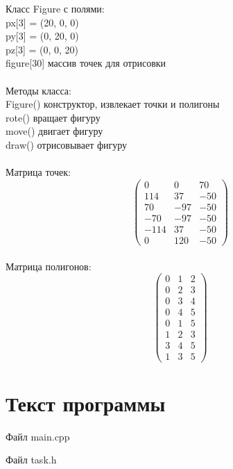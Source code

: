 \documentclass[14pt, a4paper]{extreport}
\begin{document}
Класс Figure с полями:\\
px[3] = (20, 0, 0)\\
py[3] = (0, 20, 0)\\
pz[3] = (0, 0, 20)\\
figure[30] массив точек для отрисовки\\
\\
Методы класса:\\
Figure() конструктор, извлекает точки и полигоны\\
rote() вращает фигуру\\
move() двигает фигуру\\
draw() отрисовывает фигуру\\
\\
Матрица точек:\\
\begin{equation*}
\left(
\begin{array}{cccc}
0 & 0 & 70\\
114 & 37 & -50\\
70 & -97 & -50\\
-70 & -97 & -50\\
-114 & 37 & -50\\
0 & 120 & -50
\end{array}
\right)
\end{equation*}
\\
Матрица полигонов:
\begin{equation*}
\left(
\begin{array}{cccc}
0 & 1 & 2\\
0 & 2 & 3\\
0 & 3 & 4\\
0 & 4 & 5\\
0 & 1 & 5\\
1 & 2 & 3\\
3 & 4 & 5\\
1 & 3 & 5
\end{array}
\right)
\end{equation*}

\chapter{Текст программы}

\noindent Файл main.cpp

\pagebreak
\hrulefill

\noindent Файл task.h

\hrulefill
\end{document}
